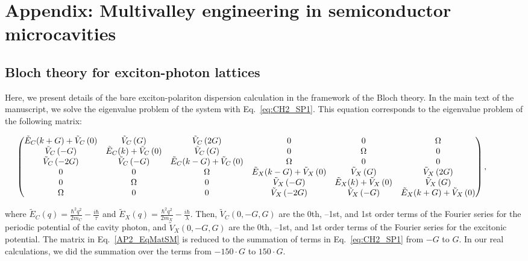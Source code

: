 \chapter{Appendix: Multivalley engineering in semiconductor microcavities}

\section{Bloch theory for exciton-photon lattices}\label{AP:A1}

Here, we present details of the bare exciton-polariton dispersion calculation in the framework of the Bloch theory.
In the main text of the manuscript, we solve the eigenvalue problem of the system with Eq.~\eqref{eq:CH2_SP1}. This equation corresponds to the eigenvalue problem of the following matrix:
%
\begin{tiny}
	\begin{equation} 	\label{AP2_EqMatSM}
		\hspace*{-10mm}
		\begin{pmatrix}
			\tilde E_C( k+G)+\tilde{V}_{C}\left( 0 \right) & \tilde{V}_{C}\left( G \right) & \tilde{V}_{C}\left( 2G \right) & 0 & 0 & \Omega \\
			\tilde{V}_{C}\left( -G \right) & \tilde E_C(k) +\tilde{V}_{C}\left( 0 \right) & \tilde{V}_{C}\left( G \right) & 0 & \Omega & 0 \\
			\tilde{V}_{C}\left( -2G \right) & \tilde{V}_{C}\left( -G \right) & \tilde E_C(k-G) + \tilde{V}_{C}\left( 0 \right) & \Omega & 0 & 0 \\
			0 & 0 & \Omega & \tilde E_X(k-G) +\tilde{V}_{X}\left( 0 \right) & \tilde{V}_{X}\left( G \right) & \tilde{V}_{X}\left( 2G \right) \\
			0 & \Omega & 0 & \tilde{V}_{X}\left( -G \right) & \tilde E_X(k)+\tilde{V}_{X}\left( 0 \right) & \tilde{V}_{X}\left( G \right)\\
			\Omega & 0 & 0 & \tilde{V}_{X}\left( -2G \right) & \tilde{V}_{X}\left( -G \right) & \tilde E_X(k+G)+\tilde{V}_{X}\left( 0 \right)
		\end{pmatrix},
	\end{equation}
\end{tiny}
%
where ${\tilde{E}_C(q)}=\frac{\hbar^2q^2}{2m_C}-\frac{i\hbar}{\tau}$ and ${\tilde{E}_X(q)}=\frac{\hbar^2q^2}{2m_X}-\frac{i\hbar}{\lambda}$. Then, $\tilde{V}_C\left( 0,-G,G \right)$ are the 0th, --1st, and 1st order terms of the Fourier series for the periodic potential of the cavity photon, and $\tilde{V}_X\left( 0,-G,G \right)$ are the 0th, --1st, and 1st order terms of the Fourier series for the excitonic potential. 
The matrix in Eq.~\eqref{AP2_EqMatSM} is reduced to the summation of terms in Eq.~\eqref{eq:CH2_SP1} from $-G$ to $G$. In our real calculations, we did the summation over the terms from $-150\cdot G$ to $150\cdot G$.

